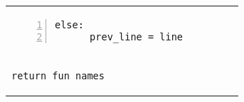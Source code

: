 \documentclass[10pt, a4paper]{article}
\begin{document}
\begin{tabular}{@{}ll@{}}
{\noindent\hspace*{0.35em}\begin{lstlisting}[numbers=left, firstnumber=last]
    else:
      prev_line = line
\end{lstlisting}}
&\\
{\noindent\hspace*{0.35em}\begin{lstlisting}[firstnumber=last]
  return fun_names
\end{lstlisting}}

\end{tabular}
\end{document}
